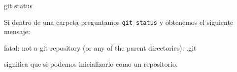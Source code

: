 \documentclass[
  spanish,
  12pt,
  letterpaper,
  DIV=11,
  numbers=noendperiod]{scrreprt}
\newenvironment{Shaded}{\begin{snugshade}}{\end{snugshade}}
\newcommand{\FunctionTok}[1]{\textcolor[rgb]{0.28,0.35,0.67}{#1}}
\newcommand{\NormalTok}[1]{\textcolor[rgb]{0.00,0.23,0.31}{#1}}
\begin{document}
\begin{Shaded}
\begin{Highlighting}[]
\FunctionTok{git}\NormalTok{ status}
\end{Highlighting}
\end{Shaded}

Si dentro de una carpeta preguntamos \texttt{git\ status} y obtenemos el
siguiente mensaje:

\begin{Shaded}
\begin{Highlighting}[]
\NormalTok{fatal: not a git repository (or any of the parent directories): .git}
\end{Highlighting}
\end{Shaded}

significa que si podemos inicializarlo como un repositorio.
\end{document}
